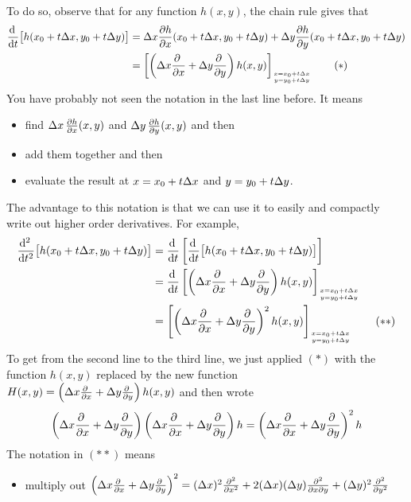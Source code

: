 {To do so, observe that for any function $h(x,y)$, the chain rule gives that
\begin{align*}
\diff{}{t}\big[h(x_0 + t\De x , y_0 + t\De y)\big]
   &= \De x\pdiff{h}{x}(x_0 + t\De x , y_0 + t\De y)
      + \De y\pdiff{h}{y}(x_0 + t\De x , y_0 + t\De y) \\
   &=\left[\left(\De x\pdiff{}{x} +\De y\pdiff{}{y}\right) h(x,y)\right]_{
                 \Atop{x =  x_0 + t\De x}{y= y_0 + t\De y}}
   \tag{$*$}
\end{align*}
You have probably not seen the notation in the last line before.
It means
\begin{itemize}
\item 
find $\De x\,\pdiff{h}{x}(x,y)$ and $\De y\,\pdiff{h}{y}(x,y)$ and then
\item
add them together and then
\item
evaluate the result at $x =  x_0 + t\Delta x$ and $y= y_0 + t\Delta y$.
\end{itemize}
The advantage to this notation is that we can use it to easily and compactly
write out higher order derivatives. For example,
\begin{align*}
\difftwo{}{t}\big[h(x_0 + t\De x , y_0 + t\De y)\big]
 &= \diff{}{t}\left[\diff{}{t}\big[h(x_0 + t\De x , y_0 + t\De y)\big]\right] \\
 &= \diff{}{t}
    \left[\left(\De x\pdiff{}{x} +\De y\pdiff{}{y}\right) h(x,y)\right]_{
                 \Atop{x =  x_0 + t\De x}{y= y_0 + t\De y}} \\
 &=\left[\left(\De x\pdiff{}{x} +\De y\pdiff{}{y}\right)^2 h(x,y)\right]_{
                 \Atop{x =  x_0 + t\De x}{y= y_0 + t\De y}}
 \tag{$**$}
\end{align*}
To get from the second line to the third line, we just applied $(*)$
with the function $h(x,y)$ replaced by the new function
$H(x,y) = \left(\De x\pdiff{}{x} +\De y\pdiff{}{y}\right) h(x,y)$
and then wrote
\begin{equation*}
\left(\De x\pdiff{}{x} +\De y\pdiff{}{y}\right)
             \left(\De x\pdiff{}{x} +\De y\pdiff{}{y}\right)h
            =\left(\De x\pdiff{}{x} +\De y\pdiff{}{y}\right)^2h
\end{equation*}
The notation in $(**)$ means
\begin{itemize}
\item
multiply out $\left(\De x\pdiff{}{x} +\De y\pdiff{}{y}\right)^2
=(\De x)^2\frac{\partial^2}{\partial x^2} 
   +2(\De x)(\De y)\frac{\partial^2}{\partial x\partial y}
   +(\De y)^2\frac{\partial^2}{\partial y^2}$

\end{itemize}}
